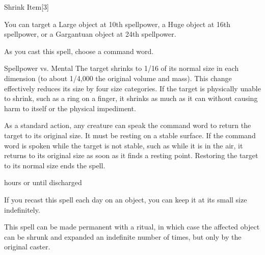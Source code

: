 \begin{spellsection}{Shrink Item}[3]
    \begin{spellheader}
    \end{spellheader}
    \begin{spellcontent}
        \begin{spelltargetinginfo}
            \spellspecial You can target a Large object at 10th spellpower, a Huge object at 16th spellpower, or a Gargantuan object at 24th spellpower.
        \end{spelltargetinginfo}
        \begin{spelleffects}
            \spellspecial As you cast this spell, choose a command word.
            \begin{spellattack}{Spellpower vs. Mental}
                \spellsuccess The target shrinks to 1/16 of its normal size in each dimension (to about 1/4,000 the original volume and mass). This change effectively reduces its size by four size categories. If the target is physically unable to shrink, such as a ring on a finger, it shrinks as much as it can without causing harm to itself or the physical impediment.

                As a standard action, any creature can speak the command word to return the target to its original size. It must be resting on a stable surface. If the command word is spoken while the target is not stable, such as while it is in the air, it returns to its original size as soon as it finds a resting point. Restoring the target to its normal size ends the spell.
            \end{spellattack}
             hours or until discharged
        \end{spelleffects}
    \end{spellcontent}
    \begin{spellfooter}
        \spellnotes  If you recast this spell each day on an object, you can keep it at its small size indefinitely.

        This spell can be made permanent with a  ritual, in which case the affected object can be shrunk and expanded an indefinite number of times, but only by the original caster.
        \miscastrandom
    \end{spellfooter}
\end{spellsection}

